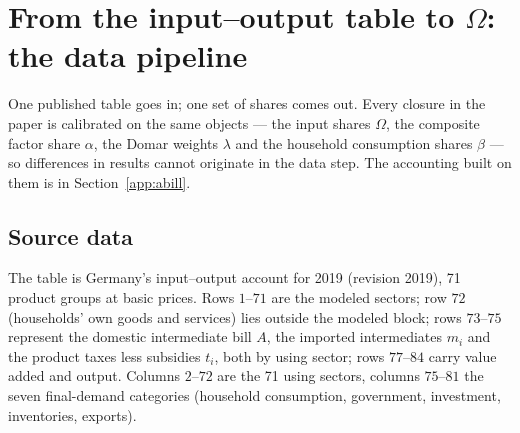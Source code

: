 \section{From the input--output table to $\Omega$: the data pipeline}\label{app:pipeline}

One published table goes in; one set of shares comes out. Every closure in the
paper is calibrated on the same objects --- the input shares $\Omega$, the
composite factor share $\alpha$, the Domar weights $\lambda$ and the household
consumption shares $\beta$ --- so differences in results cannot originate in the
data step. The accounting built on them is in Section~\ref{app:abill}.

\subsection{Source data}\label{app:pipeline-source}

The table is Germany's input--output account for 2019 (revision 2019), 71
product groups at basic prices. Rows $1$--$71$ are the modeled sectors; row $72$ (households' own goods and services) lies outside the modeled block; rows $73$--$75$ represent the domestic intermediate bill $A$, the imported intermediates $m_i$ and the product taxes less subsidies $t_i$, both by using sector; rows $77$--$84$ carry value added and output. Columns $2$--$72$ are the 71 using sectors, columns $75$--$81$ the seven final-demand categories (household consumption, government, investment,
inventories, exports).

